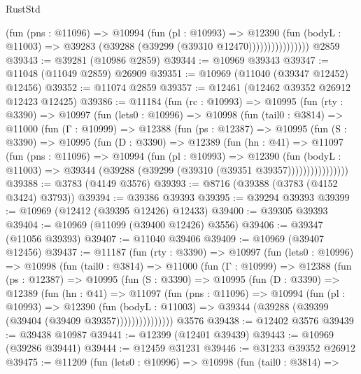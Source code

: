 \begin{lexlean}{RustStd}
\begin{coremodule}
                        (fun (pns : @11096) =>
                        @10994
                          (fun (pl : @10993) =>
                          @12390
                            (fun (bodyL : @11003) =>
                            @39283 (@39288 (@39299 (@39310 @12470))))))))))))))))
    @2859
@39343 := @39281 (@10986 @2859)
@39344 := @10969 @39343
@39347 := @11048 (@11049 @2859) @26909
@39351 := @10969 (@11040 (@39347 @12452) @12456)
@39352 := @11074 @2859
@39357 := @12461 (@12462 @39352 @26912 @12423 @12425)
@39386 := @11184
    (fun (rc : @10993) =>
    @10995
      (fun (rty : @3390) =>
      @10997
        (fun (lets0 : @10996) =>
        @10998
          (fun (tail0 : @3814) =>
          @11000
            (fun (Γ : @10999) =>
            @12388
              (fun (ps : @12387) =>
              @10995
                (fun (S : @3390) =>
                @10995
                  (fun (D : @3390) =>
                  @12389
                    (fun (hn : @41) =>
                    @11097
                      (fun (pns : @11096) =>
                      @10994
                        (fun (pl : @10993) =>
                        @12390
                          (fun (bodyL : @11003) =>
                          @39344 (@39288 (@39299 (@39310 (@39351 @39357))))))))))))))))
@39388 := @3783 (@4149 @3576)
@39393 := @8716 (@39388 (@3783 (@4152 @3424) @3793))
@39394 := @39386 @39393
@39395 := @39294 @39393
@39399 := @10969 (@12412 (@39395 @12426) @12433)
@39400 := @39305 @39393
@39404 := @10969 (@11099 (@39400 @12426) @3556)
@39406 := @39347 (@11056 @39393)
@39407 := @11040 @39406
@39409 := @10969 (@39407 @12456)
@39437 := @11187
    (fun (rty : @3390) =>
    @10997
      (fun (lets0 : @10996) =>
      @10998
        (fun (tail0 : @3814) =>
        @11000
          (fun (Γ : @10999) =>
          @12388
            (fun (ps : @12387) =>
            @10995
              (fun (S : @3390) =>
              @10995
                (fun (D : @3390) =>
                @12389
                  (fun (hn : @41) =>
                  @11097
                    (fun (pns : @11096) =>
                    @10994
                      (fun (pl : @10993) =>
                      @12390
                        (fun (bodyL : @11003) =>
                        @39344 (@39288 (@39399 (@39404 (@39409 @39357)))))))))))))))
    @3576
@39438 := @12402 @3576
@39439 := @39438 @10987
@39441 := @12399 (@12401 @39439)
@39443 := @10969 (@39286 @39441)
@39444 := @12459 @31231
@39446 := @31233 @39352 @26912
@39475 := @11209
    (fun (lets0 : @10996) =>
    @10998
      (fun (tail0 : @3814) =>

\end{coremodule}
\end{lexlean}
